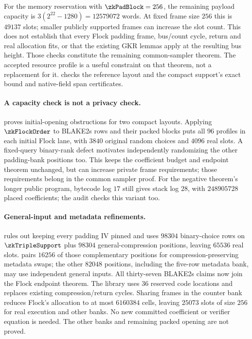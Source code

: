 For the memory reservation with $\zkPadBlock=256$, the remaining payload capacity is $3(2^{22}-1280)=12579072$ words. At fixed frame size $256$ this is $49137$ slots; smaller publicly supported frames can increase the slot count. This does not establish that every Flock padding frame, bus/count cycle, return and real allocation fits, or that the existing GKR lemmas apply at the resulting bus height. Those checks constitute the remaining common-sampler theorem. The accepted resource profile is a useful constraint on that theorem, not a replacement for it.  checks the reference layout and the compact support's exact bound and native-field span certificates.

\paragraph{A capacity check is not a privacy check.}  proves initial-opening obstructions for two compact layouts. Applying $\zkFlockOrder$ to BLAKE2s rows and their packed blocks puts all $96$ profiles in each initial Flock lane, with $3840$ original random choices and $4096$ real slots. A fixed-query binary-rank defect motivates independently randomizing the other padding-bank positions too. This keeps the coefficient budget and endpoint theorem unchanged, but can increase private frame requirements; those requirements belong in the common sampler proof. For the negative theorem's longer public program, bytecode log $17$ still gives stack log $28$, with $248905728$ placed coefficients; the audit checks this variant too.

\paragraph{General-input and metadata refinements.}  rules out keeping every padding IV pinned and uses $98304$ binary-choice rows on $\zkTripleSupport$ plus $98304$ general-compression positions, leaving $65536$ real slots.  pairs $16256$ of those complementary positions for compression-preserving metadata swaps; the other $82048$ positions, including the five-row metadata bank, may use independent general inputs. All thirty-seven BLAKE2s claims now join the Flock endpoint theorem. The library uses $36$ reserved code locations and replaces existing compression/return cycles. Sharing frames in the counter bank reduces Flock's allocation to at most $6160384$ cells, leaving $25073$ slots of size $256$ for real execution and other banks. No new committed coefficient or verifier equation is needed. The other banks and remaining packed opening are not proved.

